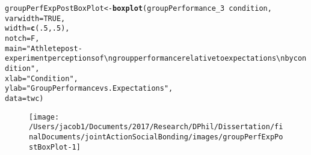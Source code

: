 \documentclass[english]{article}\usepackage[]{graphicx}\usepackage[]{color}
\makeatletter
\def\maxwidth{ %
  \ifdim\Gin@nat@width>\linewidth
    \linewidth
  \else
    \Gin@nat@width
  \fi
}
\newcommand{\hlnum}[1]{\textcolor[rgb]{0.686,0.059,0.569}{#1}}%
\newcommand{\hlstr}[1]{\textcolor[rgb]{0.192,0.494,0.8}{#1}}%
\newcommand{\hlopt}[1]{\textcolor[rgb]{0,0,0}{#1}}%
\newcommand{\hlstd}[1]{\textcolor[rgb]{0.345,0.345,0.345}{#1}}%
\newcommand{\hlkwb}[1]{\textcolor[rgb]{0.69,0.353,0.396}{#1}}%
\newcommand{\hlkwc}[1]{\textcolor[rgb]{0.333,0.667,0.333}{#1}}%
\newcommand{\hlkwd}[1]{\textcolor[rgb]{0.737,0.353,0.396}{\textbf{#1}}}%
\newenvironment{kframe}{%
 \def\at@end@of@kframe{}%
 \ifinner\ifhmode%
  \def\at@end@of@kframe{\end{minipage}}%
  \begin{minipage}{\columnwidth}%
 \fi\fi%
 \def\FrameCommand##1{\hskip\@totalleftmargin \hskip-\fboxsep
 \colorbox{shadecolor}{##1}\hskip-\fboxsep
     \hskip-\linewidth \hskip-\@totalleftmargin \hskip\columnwidth}%
 \MakeFramed {\advance\hsize-\width
   \@totalleftmargin\z@ \linewidth\hsize
   \@setminipage}}%
 {\par\unskip\endMakeFramed%
 \at@end@of@kframe}
\newenvironment{knitrout}{}{} %
\makeatother
\begin{document}
\begin{knitrout}
\color{fgcolor}\begin{kframe}
\begin{alltt}
  \hlstd{groupPerfExpPostBoxPlot} \hlkwb{<-} \hlkwd{boxplot}\hlstd{(groupPerformance_3} \hlopt{~} \hlstd{condition,}
                                          \hlkwc{varwidth} \hlstd{=} \hlnum{TRUE}\hlstd{,}
                                          \hlkwc{width} \hlstd{=} \hlkwd{c}\hlstd{(}\hlnum{.5}\hlstd{,}\hlnum{.5}\hlstd{),}
                                          \hlkwc{notch} \hlstd{= F,}
                                          \hlkwc{main} \hlstd{=} \hlstr{"Athlete post-experiment perceptions of \textbackslash{}n group performance relative to expectations \textbackslash{}n by condition"}\hlstd{,}
                                          \hlkwc{xlab} \hlstd{=} \hlstr{"Condition"}\hlstd{,}
                                          \hlkwc{ylab} \hlstd{=} \hlstr{"Group Performance vs. Expectations"}\hlstd{,}
                                          \hlkwc{data} \hlstd{= twc)}
\end{alltt}
\end{kframe}\begin{figure}

{\centering \texttt{[image: /Users/jacob1/Documents/2017/Research/DPhil/Dissertation/finalDocuments/jointActionSocialBonding/images/groupPerfExpPostBoxPlot-1]} 

}

\end{figure}


\end{knitrout}
\end{document}
